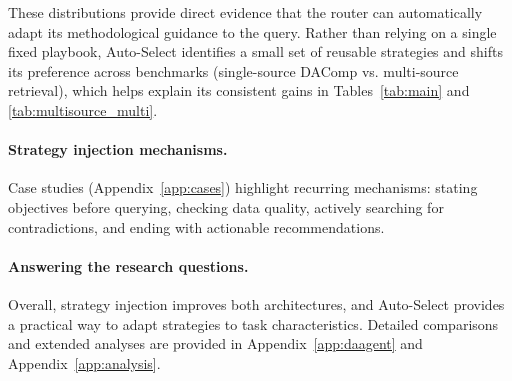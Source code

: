 These distributions provide direct evidence that the router can automatically adapt its methodological guidance to the query. Rather than relying on a single fixed playbook, Auto-Select identifies a small set of reusable strategies and shifts its preference across benchmarks (single-source DAComp vs. multi-source retrieval), which helps explain its consistent gains in Tables~\ref{tab:main} and \ref{tab:multisource_multi}.

\paragraph{Strategy injection mechanisms.}
Case studies (Appendix~\ref{app:cases}) highlight recurring mechanisms: stating objectives before querying, checking data quality, actively searching for contradictions, and ending with actionable recommendations.

\paragraph{Answering the research questions.}
Overall, strategy injection improves both architectures, and Auto-Select provides a practical way to adapt strategies to task characteristics. Detailed comparisons and extended analyses are provided in Appendix~\ref{app:daagent} and Appendix~\ref{app:analysis}.
